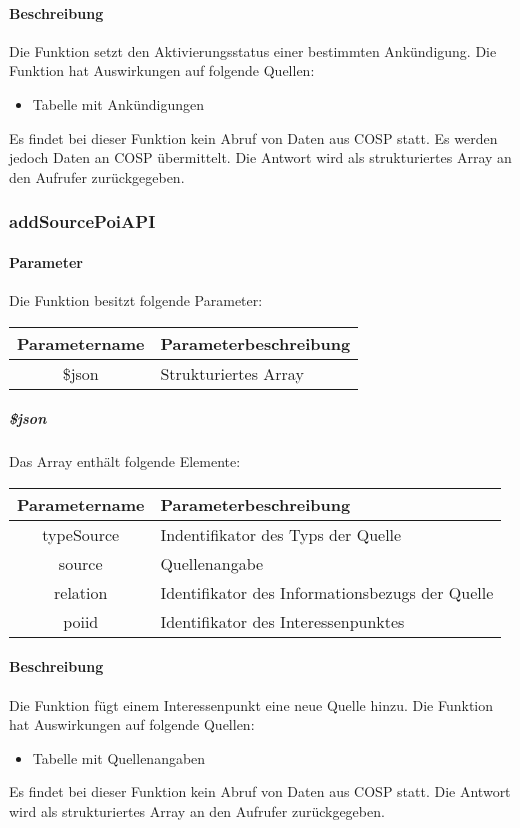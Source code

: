 \paragraph{Beschreibung} Die Funktion setzt den Aktivierungsstatus einer bestimmten Ankündigung. Die Funktion hat Auswirkungen auf folgende Quellen:
\begin{itemize}
	\item Tabelle mit Ankündigungen
\end{itemize}
Es findet bei dieser Funktion kein Abruf von Daten aus {\glqq COSP\grqq} statt. Es werden jedoch Daten an {\glqq COSP\grqq} übermittelt. Die Antwort wird als strukturiertes Array an den Aufrufer zurückgegeben.
\subsubsection{addSourcePoiAPI}
\paragraph{Parameter} Die Funktion besitzt folgende Parameter:
\begin{table}[H]
	\begin{tabular}{|c|p{11cm}|}
		\hline
		\textbf{Parametername} & \textbf{Parameterbeschreibung} \\ \hline
		\$json & Strukturiertes Array \\ \hline
	\end{tabular}
\end{table}
\subparagraph{\$json}Das Array enthält folgende Elemente:
\begin{table}[H]
	\begin{tabular}{|c|p{11cm}|}
		\hline
		\textbf{Parametername} & \textbf{Parameterbeschreibung} \\ \hline
		typeSource & Indentifikator des Typs der Quelle \\ \hline
		source     & Quellenangabe \\ \hline
		relation   & Identifikator des Informationsbezugs der Quelle \\ \hline
		poiid      & Identifikator des Interessenpunktes \\ \hline
	\end{tabular}
\end{table}
\paragraph{Beschreibung} Die Funktion fügt einem Interessenpunkt eine neue Quelle hinzu. Die Funktion hat Auswirkungen auf folgende Quellen:
\begin{itemize}
	\item Tabelle mit Quellenangaben
\end{itemize}
Es findet bei dieser Funktion kein Abruf von Daten aus {\glqq COSP\grqq} statt. Die Antwort wird als strukturiertes Array an den Aufrufer zurückgegeben.
